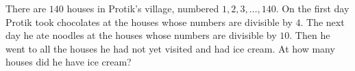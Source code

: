 There are $140$ houses in Protik's village, numbered $1,2,3,\dots,140$. On the first day Protik took chocolates at the houses whose numbers are divisible by $4$. The next day he ate noodles at the houses whose numbers are divisible by $10$. Then he went to all the houses he had not yet visited and had ice cream. At how many houses did he have ice cream?

